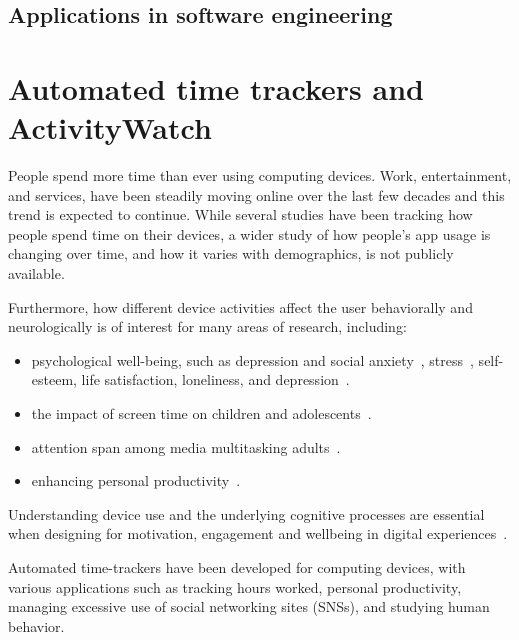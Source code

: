     \subsection{Applications in software engineering}





\section{Automated time trackers and ActivityWatch}

    People spend more time than ever using computing devices. Work, entertainment, and services, have been steadily moving online over the last few decades and this trend is expected to continue.
    While several studies have been tracking how people spend time on their devices, a wider study of how people's app usage is changing over time, and how it varies with demographics, is not publicly available.

    Furthermore, how different device activities affect the user behaviorally and neurologically is of interest for many areas of research, including:

    \begin{itemize}
        \item psychological well-being, such as depression and social anxiety~\cite{selfhout_different_2009}\cite{shah_nonrecursive_2002}, stress~\cite{mark_stress_2014}, self-esteem, life satisfaction, loneliness, and depression~\cite{huang_time_2017}.
        \item the impact of screen time on children and adolescents~\cite{subrahmanyam_impact_2001}.
        \item attention span among media multitasking adults~\cite{mark_stress_2014}.
        \item enhancing personal productivity~\cite{kim_timeaware_2016}.
    \end{itemize}

    Understanding device use and the underlying cognitive processes are essential when designing for motivation, engagement and wellbeing in digital experiences~\cite{peters_designing_2018}.

    Automated time-trackers have been developed for computing devices, with various applications such as tracking hours worked, personal productivity, managing excessive use of social networking sites (SNSs), and studying human behavior.

